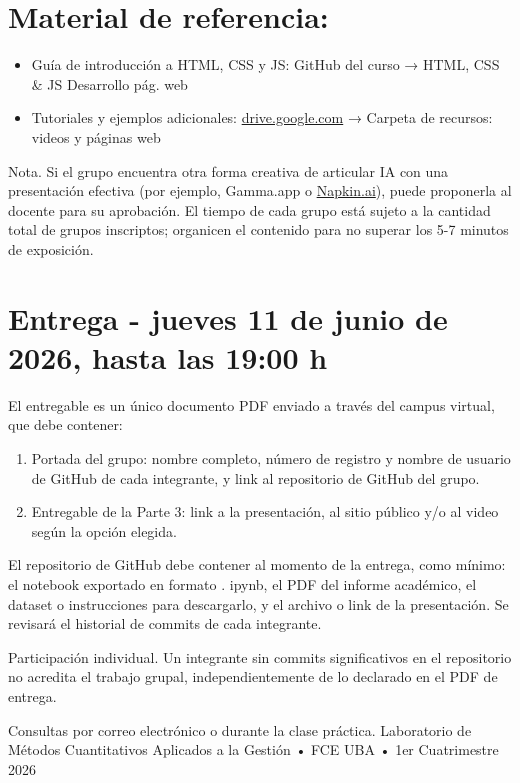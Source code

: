 \documentclass[10pt]{article}
\begin{document}
\section*{Material de referencia:}
\begin{itemize}
  \item Guía de introducción a HTML, CSS y JS: GitHub del curso → HTML, CSS \& JS Desarrollo pág. web
  \item Tutoriales y ejemplos adicionales: \href{http://drive.google.com}{drive.google.com} → Carpeta de recursos: videos y páginas web
\end{itemize}

Nota. Si el grupo encuentra otra forma creativa de articular IA con una presentación efectiva (por ejemplo, Gamma.app o \href{http://Napkin.ai}{Napkin.ai}), puede proponerla al docente para su aprobación. El tiempo de cada grupo está sujeto a la cantidad total de grupos inscriptos; organicen el contenido para no superar los 5-7 minutos de exposición.

\section*{Entrega - jueves 11 de junio de 2026, hasta las 19:00 h}
El entregable es un único documento PDF enviado a través del campus virtual, que debe contener:

\begin{enumerate}
  \item Portada del grupo: nombre completo, número de registro y nombre de usuario de GitHub de cada integrante, y link al repositorio de GitHub del grupo.
  \item Entregable de la Parte 3: link a la presentación, al sitio público y/o al video según la opción elegida.
\end{enumerate}

El repositorio de GitHub debe contener al momento de la entrega, como mínimo: el notebook exportado en formato . ipynb, el PDF del informe académico, el dataset o instrucciones para descargarlo, y el archivo o link de la presentación. Se revisará el historial de commits de cada integrante.

Participación individual. Un integrante sin commits significativos en el repositorio no acredita el trabajo grupal, independientemente de lo declarado en el PDF de entrega.

Consultas por correo electrónico o durante la clase práctica. Laboratorio de Métodos Cuantitativos Aplicados a la Gestión • FCE UBA • 1er Cuatrimestre 2026
\end{document}
